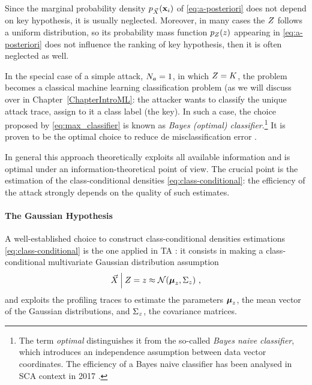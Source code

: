 \begin{remark}Since the marginal probability density $p_{\vec{X}}(\textbf{x}_i)$ of \eqref{eq:a-posteriori} does not depend on key hypothesis, it is usually neglected. Moreover, in many cases the $Z$ follows a uniform distribution, so its probability mass function $p_{Z}(z)$ appearing in \eqref{eq:a-posteriori}  does not influence the ranking of key hypothesis, then it is often neglected as well. 
\end{remark}

\begin{remark}
In the special case of a simple attack, \ie $N_a = 1$, in which $Z = K$, the problem becomes a classical machine learning classification problem (as we will discuss over in Chapter~\ref{ChapterIntroML}: the attacker wants to classify the unique attack trace, \ie assign to it a class label (the key). In such a case, the choice proposed by \eqref{eq:max_classifier} is known as \emph{Bayes (optimal) classifier}.\footnote{The term \emph{optimal} distinguishes it from the so-called \emph{Bayes naive classifier}, which introduces an independence assumption between data vector coordinates. The efficiency of a Bayes naive classifier has been analysed in SCA context in 2017 \cite{picek2017template}.} It is proven to be the optimal choice to reduce de misclassification error \cite{christopher2006pattern}.
\end{remark}

In general this approach theoretically exploits all available information and is optimal under an information-theoretical point of view. The crucial point is the estimation of the class-conditional densities \eqref{eq:class-conditional}: the efficiency of the attack strongly depends on the quality of such estimates. 

\paragraph{The Gaussian Hypothesis} A well-established choice to construct class-conditional densities estimations \ref{eq:class-conditional} is the one applied in TA \cite{Chari2003}: it consists in making a class-conditional multivariate Gaussian distribution assumption
\begin{equation}\label{eq:gaussian_assumption}
\vec{X}\:\Big\vert\: Z =z \approx \mathcal{N}(\boldsymbol{\mu}_z, \Sigma_z)\mbox{ ,}
\end{equation} 
and exploits the profiling traces to estimate the  parameters $\boldsymbol{\mu}_z$, \ie the mean vector of the Gaussian distributions, and $ \Sigma_z$, \ie the covariance matrices. \\

